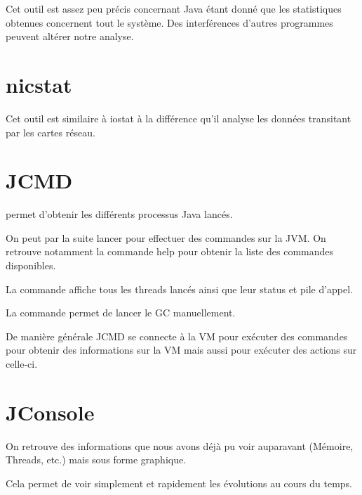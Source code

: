 \documentclass{report}
\begin{document}
			Cet outil est assez peu précis concernant Java étant donné que les statistiques obtenues concernent tout le système.
			Des interférences d'autres programmes peuvent altérer notre analyse.
			
		\section{nicstat}
			Cet outil est similaire à iostat à la différence qu'il analyse les données transitant par les cartes réseau.
			
			
		\section{JCMD}
			 permet d'obtenir les différents processus Java lancés.
			
			On peut par la suite lancer  pour effectuer des commandes sur la JVM.
			On retrouve notamment la commande help pour obtenir la liste des commandes disponibles.
			
			La commande  affiche tous les threads lancés ainsi que leur status et pile d'appel.
			
			La commande  permet de lancer le GC manuellement.
			
			De manière générale JCMD se connecte à la VM pour exécuter des commandes pour obtenir des informations sur la VM mais aussi pour exécuter des actions sur celle-ci.
			
		\section{JConsole}
			On retrouve des informations que nous avons déjà pu voir auparavant (Mémoire, Threads, etc.) mais sous forme graphique.
			
			Cela permet de voir simplement et rapidement les évolutions au cours du temps.
			
			\begin{figure}[H]
				\begin{minipage}{0.49\textwidth}
				\end{minipage}
				\begin{minipage}{0.49\textwidth}
				\end{minipage}
			\end{figure}
			
\end{document}
